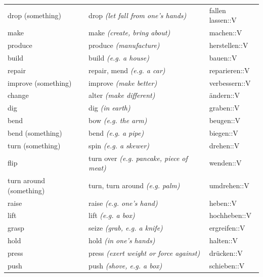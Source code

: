 \begin{center}
\begin{longtable}{lll}
{\sc \lowercase{	DROP \footnotesize (SOMETHING)	}}	&	drop	\textit{\footnotesize (let fall from one's hands)}	&	fallen lassen::V	\\
{\sc \lowercase{	MAKE	}}	&	make	\textit{\footnotesize (create, bring about)}	&	machen::V	\\
{\sc \lowercase{	PRODUCE	}}	&	produce	\textit{\footnotesize (manufacture)}	&	herstellen::V	\\
{\sc \lowercase{	BUILD	}}	&	build	\textit{\footnotesize (e.g. a house)}	&	bauen::V	\\
{\sc \lowercase{	REPAIR	}}	&	repair, mend	\textit{\footnotesize (e.g. a car)}	&	reparieren::V	\\
{\sc \lowercase{	IMPROVE \footnotesize (SOMETHING)	}}	&	improve	\textit{\footnotesize (make better)}	&	verbessern::V	\\
{\sc \lowercase{	CHANGE	}}	&	alter	\textit{\footnotesize (make different)}	&	ändern::V	\\
{\sc \lowercase{	DIG	}}	&	dig	\textit{\footnotesize (in earth)}	&	graben::V	\\
{\sc \lowercase{	BEND	}}	&	bow	\textit{\footnotesize (e.g. the arm)}	&	beugen::V	\\
{\sc \lowercase{	BEND \footnotesize (SOMETHING)	}}	&	bend	\textit{\footnotesize (e.g. a pipe)}	&	biegen::V	\\
{\sc \lowercase{	TURN \footnotesize (SOMETHING)	}}	&	spin	\textit{\footnotesize (e.g. a skewer)}	&	drehen::V	\\
{\sc \lowercase{	FLIP	}}	&	turn over	\textit{\footnotesize (e.g. pancake, piece of meat)}	&	wenden::V	\\
{\sc \lowercase{	\footnotesize TURN AROUND \footnotesize (SOMETHING)	}}	&	turn, turn around	\textit{\footnotesize (e.g. palm)}	&	umdrehen::V	\\
{\sc \lowercase{	RAISE	}}	&	raise	\textit{\footnotesize (e.g. one's hand)}	&	heben::V	\\
{\sc \lowercase{	LIFT	}}	&	lift	\textit{\footnotesize (e.g. a box)}	&	hochheben::V	\\
{\sc \lowercase{	GRASP	}}	&	seize	\textit{\footnotesize (grab, e.g. a knife)}	&	ergreifen::V	\\
{\sc \lowercase{	HOLD	}}	&	hold	\textit{\footnotesize (in one's hands)}	&	halten::V	\\
{\sc \lowercase{	PRESS	}}	&	press	\textit{\footnotesize (exert weight or force against)}	&	drücken::V	\\
{\sc \lowercase{	PUSH	}}	&	push	\textit{\footnotesize (shove, e.g. a box)}	&	schieben::V	\\

\end{longtable}
\end{center}
